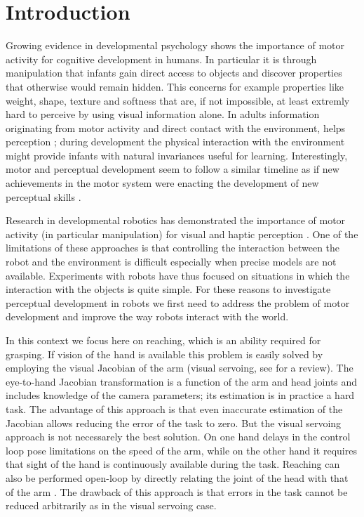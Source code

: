 \section{Introduction}
Growing evidence in developmental psychology shows the importance 
of motor activity for cognitive development in humans. In particular 
it is through manipulation that infants gain direct access to objects 
and discover properties that otherwise would remain hidden. 
This concerns for example properties like weight, shape, texture and 
softness that are, if not impossible, at least extremly hard to perceive 
by using visual information alone. In adults information originating 
from motor activity and direct contact with the environment, helps 
perception \cite{klatzky87hand}; during development
the physical interaction with the environment might
provide infants with natural invariances useful for learning.
Interestingly, motor and perceptual development seem to follow a similar 
timeline as if new achievements in the motor system were enacting
the development of new perceptual skills 
\cite{bushnell93motor}.

Research in developmental robotics has demonstrated the importance of
motor activity (in particular manipulation) for visual and haptic 
perception \cite{fitzpatrick07shared}. One of the 
limitations of these approaches is that controlling the interaction between
the robot and the environment is difficult especially when precise models are
not available. Experiments with robots have thus focused on situations
in which the interaction with the objects is quite simple. For these reasons
to investigate perceptual development in robots we first need to 
address the problem of motor development and improve the way robots interact
with the world.

In this context we focus here on reaching, which is an ability required for 
grasping. If vision of the hand is available this problem is easily solved 
by employing the visual Jacobian of the arm (visual servoing, see 
\cite{hutchinson96tutorial} for a review). The 
eye-to-hand Jacobian transformation is a function of the arm and head joints 
and includes knowledge of the camera parameters; its estimation is in practice 
a hard task.
The advantage of this approach is that even inaccurate estimation of the Jacobian
allows reducing the error of the task to zero. But the visual servoing approach 
is not necessarely the best solution. On one hand delays in the control loop pose 
limitations on the speed of the arm, while on the other hand it
requires that sight of the hand is continuously available during the task. 
Reaching can also be performed open-loop by directly relating the joint of 
the head with that of the arm 
\cite{blackburn94learning,metta99developmental}. 
The drawback of this approach is that errors in the task cannot be reduced 
arbitrarily as in the visual servoing case.

